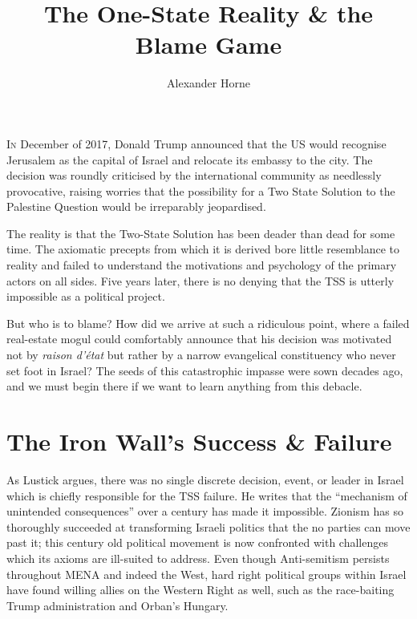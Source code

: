 \documentclass[letterpaper,12pt,twoside]{article} %
\title{\Huge The One-State Reality \& the Blame Game}
\author{\large Alexander Horne}
\date{} %
\begin{document}
\maketitle

\begin{multicols}{2}

\lettrine[lraise=0.0, nindent=0.5em, slope=-.5em]{I}{n} December of 2017, Donald Trump announced that the US would recognise Jerusalem as the capital of Israel and relocate its embassy to the city. The decision was roundly criticised by the international community as needlessly provocative, raising worries that the possibility for a Two State Solution to the Palestine Question would be irreparably jeopardised. 

The reality is that the Two-State Solution has been deader than dead for some time. The axiomatic precepts from which it is derived bore little resemblance to reality and failed to understand the motivations and psychology of the primary actors on all sides. Five years later, there is no denying that the TSS is utterly impossible as a political project. 

But who is to blame? How did we arrive at such a ridiculous point, where a failed real-estate mogul could comfortably announce that his decision was motivated not by \textit{raison d'état} but rather by a narrow evangelical constituency who never set foot in Israel? The seeds of this catastrophic impasse were sown decades ago, and we must begin there if we want to learn anything from this debacle.

\section{The Iron Wall's Success \& Failure}

As Lustick argues, there was no single discrete decision, event, or leader in Israel which is chiefly responsible for the TSS failure. He writes that the ``mechanism of unintended consequences'' over a century has made it impossible.\autocite{lustick2019paradigm} Zionism has so thoroughly succeeded at transforming Israeli politics that the no parties can move past it; this century old political movement is now confronted with challenges which its axioms are ill-suited to address. Even though Anti-semitism persists throughout MENA and indeed the West, hard right political groups within Israel have found willing allies on the Western Right as well, such as the race-baiting Trump administration and Orban's Hungary. 


\end{multicols}
\end{document}
